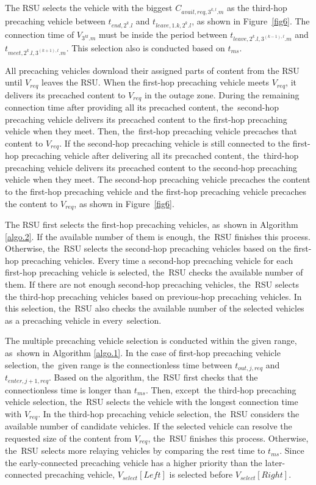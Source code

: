 \documentclass[electronics,aricle,accept,pdftex,moreauthors]{Definitions/mdpi}
\begin{document}
The RSU selects the vehicle with the biggest $C_{avail,req,3^{k,l}.m}$ as the third-hop precaching vehicle between $t_{end, 2^{k}.l}$ and $t_{leave, 1.k, 2^{k}.l}$, as shown in Figure~\ref{fig6}.
The connection time of $V_{3^{kl}.m}$ must be inside the period between $t_{leave,2^{k}.l,3^{(k-1),l}.m}$ and $t_{meet,2^{k}.l,3^{(k+1),l}.m}$.
This selection also is conducted based on $t_{ms}$.

All precaching vehicles download their assigned parts of content from the RSU until $V_{req}$ leaves the RSU.
When the first-hop precaching vehicle meets $V_{req}$, it delivers its precached content to $V_{req}$ in the outage zone.
During the remaining connection time after providing all its precached content, the~second-hop precaching vehicle delivers its precached content to the first-hop precaching vehicle when they meet.
Then, the~first-hop precaching vehicle precaches that content to $V_{req}$.
If the second-hop precaching vehicle is still connected to the first-hop precaching vehicle after delivering all its precached content, the~third-hop precaching vehicle delivers its precached content to the second-hop precaching vehicle when they meet.
The second-hop precaching vehicle precaches the content to the first-hop precaching vehicle and the first-hop precaching vehicle precaches the content to $V_{req}$, as shown in Figure~\ref{fig6}.

The RSU first selects the first-hop precaching vehicles, as~shown in Algorithm \ref{algo.2}.
If the available number of them is enough, the~RSU finishes this process.
Otherwise, the~RSU selects the second-hop precaching vehicles based on the first-hop precaching vehicles.
Every time a second-hop precaching vehicle for each first-hop precaching vehicle is selected, the~RSU checks the available number of them.
If there are not enough second-hop precaching vehicles, the~RSU selects the third-hop precaching vehicles based on previous-hop precaching vehicles.
In this selection, the~RSU also checks the available number of the selected vehicles as a precaching vehicle in every~selection.

The multiple precaching vehicle selection is conducted within the given range, as~shown in Algorithm \ref{algo.1}.
In the case of first-hop precaching vehicle selection, the~given range is the connectionless time between $t_{out, j,req}$ and $t_{enter,j+1,req}$.
Based on the algorithm, the~RSU first checks that the connectionless time is longer than $t_{ms}$.
Then, except~the third-hop precaching vehicle selection, the~RSU selects the vehicle with the longest connection time with $V_{req}$.
In the third-hop precaching vehicle selection, the~RSU considers the available number of candidate vehicles.
If the selected vehicle can resolve the requested size of the content from $V_{req}$, the~RSU finishes this process.
Otherwise, the~RSU selects more relaying vehicles by comparing the rest time to $t_{ms}$.
Since the early-connected precaching vehicle has a higher priority than the later-connected precaching vehicle, $V_{select}[Left]$ is selected before $V_{select}[Right]$.
\end{document}
